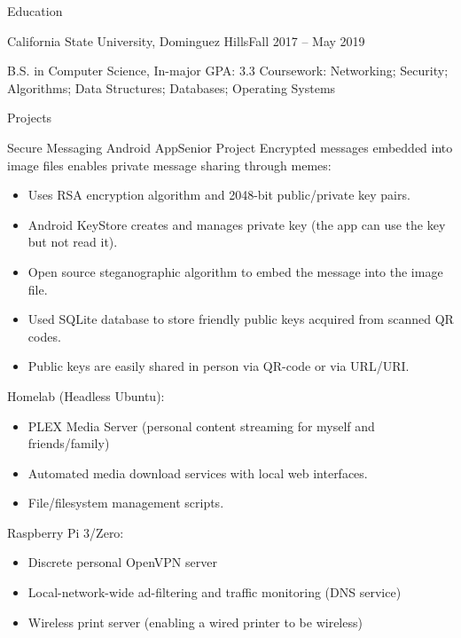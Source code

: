 \documentclass[]{mcdowellcv}
\begin{document}
	\makeheader
	
	\begin{cvsection}{Education}
		\begin{cvsubsection}[2]{California State University, Dominguez Hills}{}{Fall 2017 -- May 2019}
			
			\par B.S. in Computer Science, In-major GPA: 3.3
			\newline Coursework: Networking; Security; Algorithms; Data Structures; Databases; Operating Systems
			
		\end{cvsubsection}
	\end{cvsection}

	\begin{cvsection}{Projects}
		\begin{cvsubsection}{Secure Messaging Android App}{}{Senior Project}
			Encrypted messages embedded into image files enables private message sharing through memes: 
			\begin{itemize}[topsep=-3pt]
				\item Uses RSA encryption algorithm and 2048-bit public/private key pairs.
				\item Android KeyStore creates and manages private key (the app can use the key but not read it).
				\item Open source steganographic algorithm to embed the message into the image file.
				\item Used SQLite database to store friendly public keys acquired from scanned QR codes.
				\item Public keys are easily shared in person via QR-code or via URL/URI.
			\end{itemize}
		\end{cvsubsection}
		
		\begin{cvsubsection}{Homelab (Headless Ubuntu):}{}{}
			\begin{itemize}
				\item PLEX Media Server (personal content streaming for myself and friends/family)
				\item Automated media download services with local web interfaces.
				\item File/filesystem management scripts.
			\end{itemize}
		\end{cvsubsection}
		\begin{cvsubsection}{Raspberry Pi 3/Zero:}{}{}
			\begin{itemize}
				\item Discrete personal OpenVPN server
				\item Local-network-wide ad-filtering and traffic monitoring (DNS service)
				\item Wireless print server (enabling a wired printer to be wireless)
			\end{itemize}
		\end{cvsubsection}
		

\end{cvsection}
\end{document}
